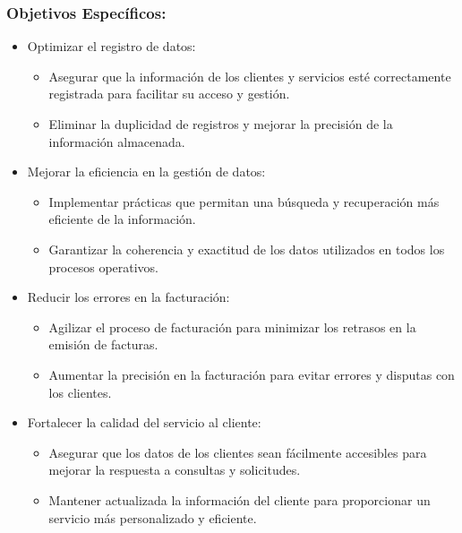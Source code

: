 \subsubsection*{Objetivos Específicos: } 
    \begin{itemize}
        \item Optimizar el registro de datos:
        \begin{itemize}
            \item Asegurar que la información de los clientes y servicios esté correctamente registrada para facilitar su acceso y gestión.
            \item Eliminar la duplicidad de registros y mejorar la precisión de la información almacenada.
        \end{itemize}        
        
        \item Mejorar la eficiencia en la gestión de datos:
        \begin{itemize}
            \item Implementar prácticas que permitan una búsqueda y recuperación más eficiente de la información.
            \item Garantizar la coherencia y exactitud de los datos utilizados en todos los procesos operativos.
        \end{itemize}        

        \item Reducir los errores en la facturación:
        \begin{itemize}
            \item Agilizar el proceso de facturación para minimizar los retrasos en la emisión de facturas.
            \item Aumentar la precisión en la facturación para evitar errores y disputas con los clientes.
        \end{itemize}        
        
        \item Fortalecer la calidad del servicio al cliente:
        \begin{itemize}
            \item Asegurar que los datos de los clientes sean fácilmente accesibles para mejorar la respuesta a consultas y solicitudes.
            \item Mantener actualizada la información del cliente para proporcionar un servicio más personalizado y eficiente.
        \end{itemize}        
    \end{itemize}
    
